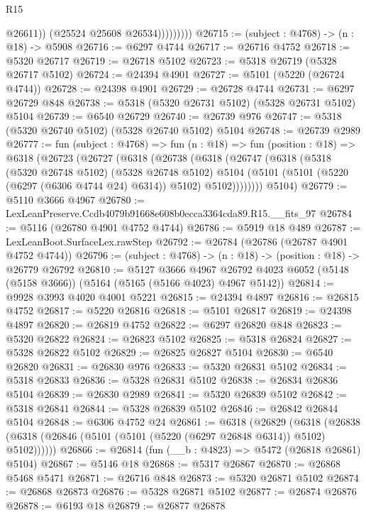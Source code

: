 \begin{lexlean}{R15}
\begin{coremodule}
{{{{{{{{{{{                        @26611))
                    (@25524 @25608 @26534)))))))))
@26715 := (subject : @4768) -> (n : @18) -> @5908
@26716 := @6297 @4744
@26717 := @26716 @4752
@26718 := @5320 @26717
@26719 := @26718 @5102
@26723 := @5318 @26719 (@5328 @26717 @5102)
@26724 := @24394 @4901
@26727 := @5101 (@5220 (@26724 @4744))
@26728 := @24398 @4901
@26729 := @26728 @4744
@26731 := @6297 @26729 @848
@26738 := @5318 (@5320 @26731 @5102) (@5328 @26731 @5102) @5104
@26739 := @6540 @26729
@26740 := @26739 @976
@26747 := @5318 (@5320 @26740 @5102) (@5328 @26740 @5102) @5104
@26748 := @26739 @2989
@26777 := fun (subject : @4768) =>
  fun (n : @18) =>
  fun (position : @18) =>
  @6318
    (@26723
      (@26727
        (@6318
          (@26738
            (@6318
              (@26747
                (@6318
                  (@5318
                    (@5320 @26748 @5102)
                    (@5328 @26748 @5102)
                    @5104
                    (@5101 (@5101 (@5220 (@6297 (@6306 @4744 @24) @6314)) @5102) @5102))))))))
      @5104)
@26779 := @5110 @3666 @4967
@26780 := LexLeanPreserve.Ccdb4079b91668e608b0ecca3364cda89.R15.__fits_97
@26784 := @5116 (@26780 @4901 @4752 @4744)
@26786 := @5919 @18 @489
@26787 := LexLeanBoot.SurfaceLex.rawStep
@26792 := @26784 (@26786 (@26787 @4901 @4752 @4744))
@26796 := (subject : @4768) -> (n : @18) -> (position : @18) -> @26779 @26792
@26810 := @5127
    @3666
    @4967
    @26792
    @4023
    @6052
    (@5148 (@5158 @3666))
    (@5164 (@5165 (@5166 @4023) @4967 @5142))
@26814 := @9928 @3993 @4020 @4001 @5221
@26815 := @24394 @4897
@26816 := @26815 @4752
@26817 := @5220 @26816
@26818 := @5101 @26817
@26819 := @24398 @4897
@26820 := @26819 @4752
@26822 := @6297 @26820 @848
@26823 := @5320 @26822
@26824 := @26823 @5102
@26825 := @5318 @26824
@26827 := @5328 @26822 @5102
@26829 := @26825 @26827 @5104
@26830 := @6540 @26820
@26831 := @26830 @976
@26833 := @5320 @26831 @5102
@26834 := @5318 @26833
@26836 := @5328 @26831 @5102
@26838 := @26834 @26836 @5104
@26839 := @26830 @2989
@26841 := @5320 @26839 @5102
@26842 := @5318 @26841
@26844 := @5328 @26839 @5102
@26846 := @26842 @26844 @5104
@26848 := @6306 @4752 @24
@26861 := @6318
    (@26829
      (@6318 (@26838 (@6318 (@26846 (@5101 (@5101 (@5220 (@6297 @26848 @6314)) @5102) @5102))))))
@26866 := @26814 (fun (__b : @4823) => @5472 (@26818 @26861) @5104)
@26867 := @5146 @18
@26868 := @5317 @26867
@26870 := @26868 @5468 @5471
@26871 := @26716 @848
@26873 := @5320 @26871 @5102
@26874 := @26868 @26873
@26876 := @5328 @26871 @5102
@26877 := @26874 @26876
@26878 := @6193 @18
@26879 := @26877 @26878
}}}}}}}}}}}
\end{coremodule}
\end{lexlean}
